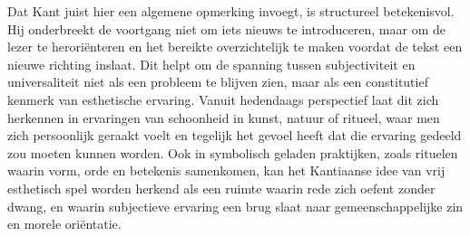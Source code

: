 \begin{mdframed}[leftmargin=0pt,rightmargin=0pt,backgroundcolor=blue!6,linecolor=white,innertopmargin=6pt,innerbottommargin=6pt]
Dat Kant juist hier een algemene opmerking invoegt, is structureel betekenisvol. Hij onderbreekt de voortgang niet om iets nieuws te introduceren, maar om de lezer te heroriënteren en het bereikte overzichtelijk te maken voordat de tekst een nieuwe richting inslaat. Dit helpt om de spanning tussen subjectiviteit en universaliteit niet als een probleem te blijven zien, maar als een constitutief kenmerk van esthetische ervaring. Vanuit hedendaags perspectief laat dit zich herkennen in ervaringen van schoonheid in kunst, natuur of ritueel, waar men zich persoonlijk geraakt voelt en tegelijk het gevoel heeft dat die ervaring gedeeld zou moeten kunnen worden. Ook in symbolisch geladen praktijken, zoals rituelen waarin vorm, orde en betekenis samenkomen, kan het Kantiaanse idee van vrij esthetisch spel worden herkend als een ruimte waarin rede zich oefent zonder dwang, en waarin subjectieve ervaring een brug slaat naar gemeenschappelijke zin en morele oriëntatie.

\end{mdframed}


